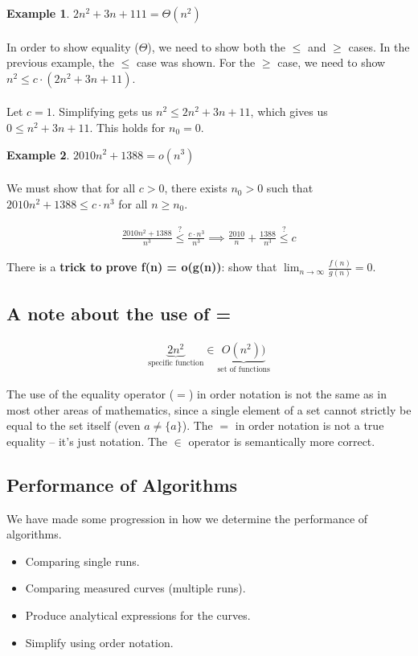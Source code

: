 \documentclass[]{article}
\theoremstyle{definition}
\newtheorem{ex}{Example}[section]
\begin{document}
			\begin{ex}
				$2n^2 + 3n + 11 1 = \Theta(n^2)$
				\\ \\
				In order to show equality ($\Theta$), we need to show both the $\le$ and $\ge$ cases. In the previous example, the $\le$ case was shown. For the $\ge$ case, we need to show $n^2 \le c \cdot (2n^2 + 3n + 11)$.
				\\ \\
				Let $c = 1$. Simplifying gets us $n^2 \le 2n^2 + 3n + 11$, which gives us $0 \le n^2 + 3n + 11$. This holds for $n_0 = 0$.
			\end{ex}
			
			\begin{ex}
				$2010n^2 + 1388 = o(n^3)$
				\\ \\
				We must show that for all $c > 0$, there exists $n_0 > 0$ such that $2010n^2 + 1388 \le c \cdot n^3$ for all $n \ge n_0$.
				
				\begin{align*}
					\frac{2010n^2+1388}{n^3} \stackrel{?}{\le} \frac{c \cdot n^3}{n^3} \implies \frac{2010}{n} + \frac{1388}{n^3} \stackrel{?}{\le} c
				\end{align*}
				
				There is a \textbf{trick to prove f(n) = o(g(n))}: show that $\lim_{n \to \infty}{}\frac{f(n)}{g(n)} = 0$.
			\end{ex}
		
		\subsection{A note about the use of =}
			\begin{align*}
				\underbrace{2n^2}_\text{specific function} \in \underbrace{O(n^2))}_\text{set of functions}
			\end{align*}
			
			The use of the equality operator ($=$) in order notation is not the same as in most other areas of mathematics, since a single element of a set cannot strictly be equal to the set itself (even $a \ne \{a\}$). The $=$ in order notation is not a true equality -- it's just notation. The $\in$ operator is semantically more correct.
		
		\subsection{Performance of Algorithms}
			We have made some progression in how we determine the performance of algorithms.
			\begin{itemize}
				\item Comparing single runs.
				\item Comparing measured curves (multiple runs).
				\item Produce analytical expressions for the curves.
				\item Simplify using order notation.
			\end{itemize}
			
\end{document}
